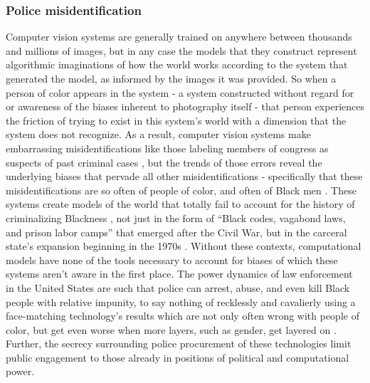 \documentclass[manuscript,screen]{acmart}
\begin{document}
\subsubsection{Police misidentification}
Computer vision systems are generally trained on anywhere between thousands and millions of images, but in any case the models that they construct represent algorithmic imaginations of how the world works according to the system that generated the model, as informed by the images it was provided.
So when a person of color appears in the system - a system constructed without regard for or awareness of the biases inherent to photography itself
\cite{benjamin2019race,photographySkin}
 - that person experiences the friction of trying to exist in this system's world with a dimension that the system does not recognize.
 As a result, computer vision systems make embarrassing misidentifications like those labeling members of congress as suspects of past criminal cases
\cite{membersOfCongress}, but the trends of those errors reveal the underlying biases that pervade all other misidentifications - specifically that these misidentifications are so often of people of color, and often of Black men
\cite{clearviewArrest}.
These systems create models of the world that totally fail to account for the history of criminalizing Blackness
\cite{smiley2016brute},
not just in the form of ``Black codes, vagabond laws, and prison labor camps'' that emerged after the Civil War, but in the carceral state's expansion beginning in the 1970s
\cite{bell2017criminalization}.
Without these contexts, computational models have none of the tools necessary to account for biases of which these systems aren't aware in the first place.
The power dynamics of law enforcement in the United States are such that police can arrest, abuse, and even kill Black people with relative impunity, to say nothing of recklessly and cavalierly using a face-matching technology's results which are not only often wrong with people of color, but get even worse when more layers, such as gender, get layered on
\cite{buolamwini2018gender}.
Further, the secrecy surrounding police procurement of these technologies limit public engagement to those already in positions of political and computational power.
\end{document}
